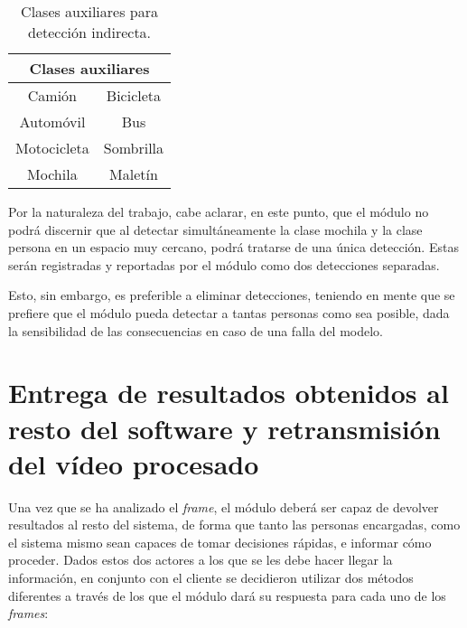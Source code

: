 \begin{table}[h]
\centering
\caption{Clases auxiliares para detección indirecta.}
\label{clases-auxiliares-etiquetas}
\begin{tabular}{cc}
\hline
\multicolumn{2}{c}{\textbf{Clases auxiliares}} \\ \hline
Camión                	  & Bicicleta              \\
Automóvil                 & Bus		               \\
Motocicleta               & Sombrilla              \\
Mochila			          & Maletín                \\  \hline
\end{tabular}
\end{table}

Por la naturaleza del trabajo, cabe aclarar, en este punto, que el módulo no podrá discernir que al detectar simultáneamente la clase mochila y la clase persona en un espacio muy cercano, podrá tratarse de una única detección. Estas serán registradas y reportadas por el módulo como dos detecciones separadas. 

Esto, sin embargo, es preferible a eliminar detecciones, teniendo en mente que se prefiere que el módulo pueda detectar a tantas personas como sea posible, dada la sensibilidad de las consecuencias en caso de una falla del modelo. 

\section{Entrega de resultados obtenidos al resto del software y retransmisión del vídeo procesado}

Una vez que se ha analizado el \textit{frame}, el módulo deberá ser capaz de devolver resultados al resto del sistema, de forma que tanto las personas encargadas, como el sistema mismo sean capaces de tomar decisiones rápidas, e informar cómo proceder. Dados estos dos actores a los que se les debe hacer llegar la información, en conjunto con el cliente se decidieron utilizar dos métodos diferentes a través de los que el módulo dará su respuesta para cada uno de los \textit{frames}:

